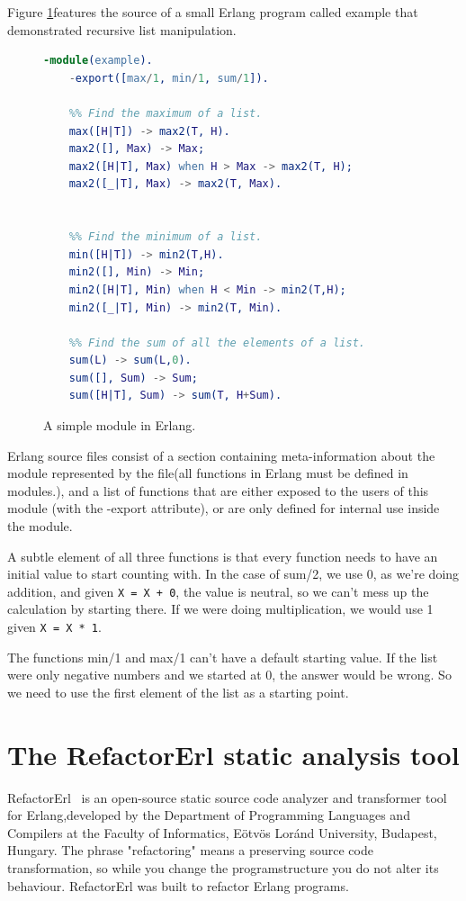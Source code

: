 Figure \ref{fig:example_erlang}features the source of a small Erlang program
called example that demonstrated recursive list manipulation.
\begin{figure}[h]
	\begin{lstlisting}[extendedchars=true, language=Erlang, basicstyle=\footnotesize\ttfamily, keywordstyle=\color{red}]
	-module(example). 
	-export([max/1, min/1, sum/1]).
	
	%% Find the maximum of a list.
	max([H|T]) -> max2(T, H).
	max2([], Max) -> Max;
	max2([H|T], Max) when H > Max -> max2(T, H);
	max2([_|T], Max) -> max2(T, Max).
	

	%% Find the minimum of a list.
	min([H|T]) -> min2(T,H).
	min2([], Min) -> Min;
	min2([H|T], Min) when H < Min -> min2(T,H);
	min2([_|T], Min) -> min2(T, Min).
	
	%% Find the sum of all the elements of a list.
	sum(L) -> sum(L,0).
	sum([], Sum) -> Sum;
	sum([H|T], Sum) -> sum(T, H+Sum).
	\end{lstlisting}
\caption{A simple module in Erlang.}
\label{fig:example_erlang}
\end{figure}

Erlang source files consist of a section containing meta-information about the module represented by the file(all functions in Erlang must be defined in
modules.), and a list of functions that are either exposed to the users of this module (with the -export attribute), or are only defined for internal use inside the module.  

A subtle element of all three functions is that every function needs to 
have an initial value to start counting with. In the case of 
sum/2, we use 0, as we’re doing addition, and given \texttt{X = X + 0}, the value is neutral, so we can’t mess up the calculation by starting there. If we were doing multiplication, we would use 1 given \texttt{X = X * 1}. 

The functions min/1 and max/1 can’t have a default starting value. If the 
list were only negative numbers and we started at 0, the answer would be 
wrong. So we need to use the first element of the list as a starting point.

\section{The RefactorErl static analysis tool} 

RefactorErl~\cite{refactorerl1, refactorerl2} is an open-source static source code analyzer and transformer tool for Erlang,developed by the Department of Programming Languages and Compilers at the Faculty of Informatics, Eötvös Loránd University, Budapest, Hungary. The phrase "refactoring" means a preserving source code transformation, so while you change the programstructure you do not alter its behaviour. RefactorErl was built to refactor Erlang programs.

